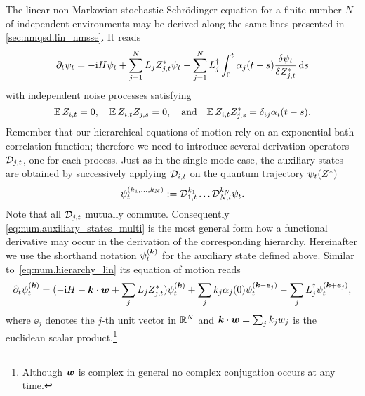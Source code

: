 The linear non-Markovian stochastic Schrödinger equation for a finite number $N$ of independent environments may be derived along the same lines presented in \autoref{sec:nmqsd.lin_nmsse}.
It reads
\begin{equation*}
  \partial_t \psit = -\ii\Hsys\psit + \sum_{j=1}^N L_j \ZZ_{j, t} \psit - \sum_{j=1}^N \adj{L}_j \int_0^t \alpha_j(t - s) \frac{\delta \psit}{\delta \ZZ_{j, t}} \dd s
\end{equation*}
with independent noise processes satisfying
\begin{equation*}
  \E\,Z_{i, t} = 0, \quad \E\,Z_{i, t} Z_{j, s} =0, \quad\mbox{and}\quad \E\,Z_{i, t} \ZZ_{j, s} = \delta_{ij}\alpha_i(t-s).
\end{equation*}
Remember that our hierarchical equations of motion rely on an exponential bath correlation function; therefore we need to introduce several derivation operators $\mathcal{D}_{j, t}$, one for each process.
Just as in the single-mode case, the auxiliary states are obtained by successively applying $\mathcal{D}_{i, t}$ on the quantum trajectory $\psitZ$
\begin{equation}
  \psit[k_1, \dots, k_N] := \adjZZ_{1, t}^{k_1} \dots \adjZZ_{N, t}^{k_N} \psit.
  \label{eq:num.auxiliary_states_multi}
\end{equation}
Note that all $\mathcal{D}_{j, t}$ mutually commute.
Consequently \autoref{eq:num.auxiliary_states_multi} is the most general form how a functional derivative may occur in the derivation of the corresponding hierarchy.
Hereinafter we use the shorthand notation $\psit[\kk]$ for the auxiliary state defined above.
Similar to~\ref{eq:num.hierarchy_lin} its equation of motion reads
\begin{equation}
  \partial_t\psit[\kk] = (-\ii\Hsys - \kk\cdot\ww + \sum_j L_j \ZZ_{j, t})\psit[\kk] + \sum_j k_j \alpha_j(0) \psit[\kk - \ee_j] - \sum_j \adj{L}_j \psit[\kk + \ee_j],
  \label{eq:num.hierarchy_lin_multi}
\end{equation}
where $\ee_j$ denotes the $j$-th unit vector in $\mathbb{R}^N$ and $\boldsymbol{k}\cdot\boldsymbol{w} = \sum_j k_jw_j$ is the euclidean scalar product.\footnote{Although $\boldsymbol{w}$ is complex in general no complex conjugation occurs at any time.}

